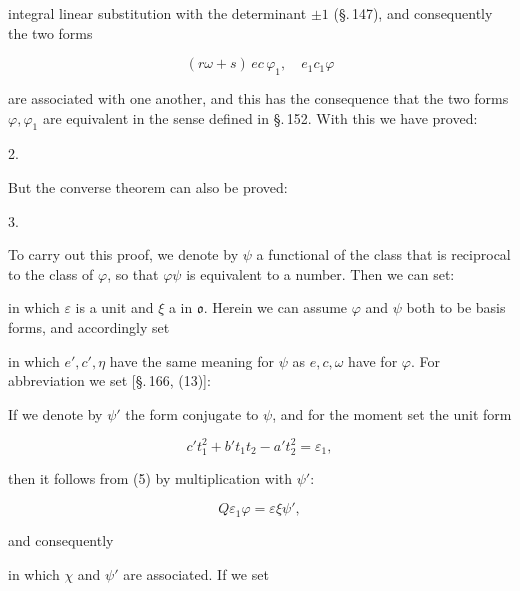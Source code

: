 
integral linear substitution with the determinant $\pm 1$ (\S.\,147), and consequently the two forms

\[ (r\omega+s)\,ec\,\varphi_1,\quad e_1c_1\varphi \]

are associated with one another, and this has the consequence that the two forms $\varphi,\varphi_1$ are equivalent in the sense defined in \S.\,152. With this we have proved:

2. 

But the converse theorem can also be proved:

3. 

To carry out this proof, we denote by $\psi$ a functional of the class that is reciprocal to the class of $\varphi$, so that $\varphi\psi$ is equivalent to a number. Then we can set:


in which $\varepsilon$ is a unit and $\xi$ a  in $\mathfrak{o}$. Herein we can assume $\varphi$ and $\psi$ both to be basis forms, and accordingly set


in which $e', c', \eta$ have the same meaning for $\psi$ as $e,c,\omega$ have for $\varphi$. For abbreviation we set [\S.\,166, (13)]:


If we denote by $\psi'$ the form conjugate to $\psi$, and for the moment set the unit form

\[ c't_1^2 + b't_1t_2 - a't_2^2 = \varepsilon_1, \]

then it follows from (5) by multiplication with $\psi'$:

\[ Q\varepsilon_1\varphi = \varepsilon\xi\psi', \]

and consequently


in which $\chi$ and $\psi'$ are associated. If we set

